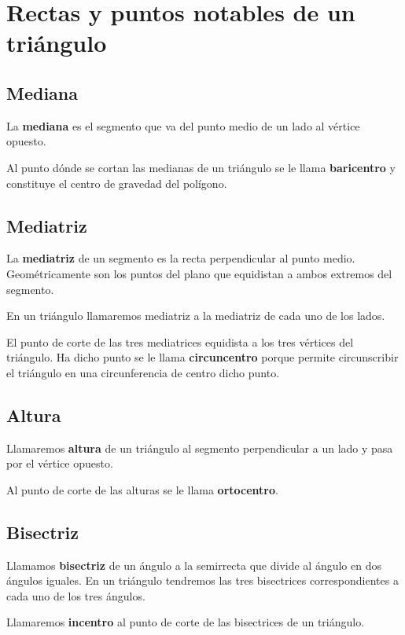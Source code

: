 \hypertarget{rectas-y-puntos-notables-de-un-triuxe1ngulo}{%
\section{Rectas y puntos notables de un
triángulo}\label{rectas-y-puntos-notables-de-un-triuxe1ngulo}}

\hypertarget{mediana}{%
\subsection{Mediana}\label{mediana}}

La \textbf{mediana} es el segmento que va del punto medio de un lado al
vértice opuesto.

Al punto dónde se cortan las medianas de un triángulo se le llama
\textbf{baricentro} y constituye el centro de gravedad del polígono.



\hypertarget{mediatriz}{%
\subsection{Mediatriz}\label{mediatriz}}

La \textbf{mediatriz} de un segmento es la recta perpendicular al punto medio.
Geométricamente son los puntos del plano que equidistan a ambos extremos
del segmento.

En un triángulo llamaremos mediatriz a la mediatriz de cada uno de los
lados.

El punto de corte de las tres mediatrices equidista a los tres vértices
del triángulo. Ha dicho punto se le llama \textbf{circuncentro} porque permite
circunscribir el triángulo en una circunferencia de centro dicho punto.



\hypertarget{altura}{%
\subsection{Altura}\label{altura}}

Llamaremos \textbf{altura} de un triángulo al segmento perpendicular a un lado y
pasa por el vértice opuesto.

Al punto de corte de las alturas se le llama \textbf{ortocentro}.



\hypertarget{bisectriz}{%
\subsection{Bisectriz}\label{bisectriz}}

Llamamos \textbf{bisectriz} de un ángulo a la semirrecta que divide al ángulo en
dos ángulos iguales.
En un triángulo tendremos las tres bisectrices correspondientes a cada uno de los tres ángulos.

Llamaremos \textbf{incentro} al punto de corte de las bisectrices de un triángulo.



%
